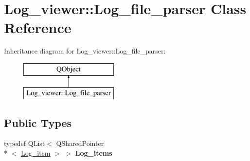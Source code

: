 \hypertarget{class_log__viewer_1_1_log__file__parser}{\section{Log\-\_\-viewer\-:\-:Log\-\_\-file\-\_\-parser Class Reference}
\label{class_log__viewer_1_1_log__file__parser}
}
Inheritance diagram for Log\-\_\-viewer\-:\-:Log\-\_\-file\-\_\-parser\-:\begin{figure}[H]
\begin{center}
\leavevmode
\includegraphics[height=2.000000cm]{class_log__viewer_1_1_log__file__parser}
\end{center}
\end{figure}
\subsection*{Public Types}
\begin{DoxyCompactItemize}
\item 
\hypertarget{class_log__viewer_1_1_log__file__parser_a97c54e090e5be114c70bd78661891ec4}{typedef Q\-List$<$ Q\-Shared\-Pointer\\*
$<$ \hyperlink{class_log__viewer_1_1_log__item}{Log\-\_\-item} $>$ $>$ {\bfseries Log\-\_\-items}}\label{class_log__viewer_1_1_log__file__parser_a97c54e090e5be114c70bd78661891ec4}

\end{DoxyCompactItemize}
